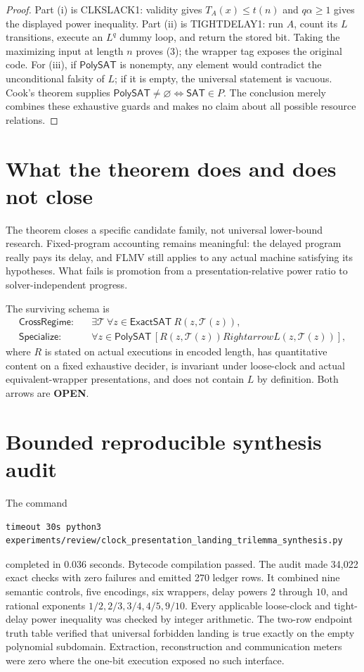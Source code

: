 \documentclass[11pt]{article}
\newcommand{\SAT}{\mathsf{SAT}}
\newcommand{\ExactSAT}{\mathsf{ExactSAT}}
\newcommand{\PolySAT}{\mathsf{PolySAT}}
\newcommand{\OPEN}{\textbf{OPEN}}
\begin{document}
\begin{proof}
Part (i) is CLKSLACK1: validity gives $T_A(x)\le t(n)$ and
$q\alpha\ge1$ gives the displayed power inequality.  Part (ii) is
TIGHTDELAY1: run $A$, count its $L$ transitions, execute an $L^q$ dummy loop,
and return the stored bit.  Taking the maximizing input at length $n$ proves
(3); the wrapper tag exposes the original code.  For (iii), if $\PolySAT$ is
nonempty, any element would contradict the unconditional falsity of $L$; if
it is empty, the universal statement is vacuous.  Cook's theorem supplies
$\PolySAT\ne\varnothing\Leftrightarrow\SAT\in P$.  The conclusion merely
combines these exhaustive guards and makes no claim about all possible
resource relations.
\end{proof}

\section{What the theorem does and does not close}

The theorem closes a specific candidate family, not universal lower-bound
research.  Fixed-program accounting remains meaningful: the delayed program
really pays its delay, and FLMV still applies to any actual machine satisfying
its hypotheses.  What fails is promotion from a presentation-relative power
ratio to solver-independent progress.

The surviving schema is
\begin{align*}
\textsf{CrossRegime}:\quad&
 \exists\mathcal T\ \forall z\in\ExactSAT\ R(z,\mathcal T(z)),\tag{5}\\
\textsf{Specialize}:\quad&
 \forall z\in\PolySAT\,[R(z,\mathcal T(z))Rightarrow
 L(z,\mathcal T(z))],                                      \tag{6}
\end{align*}
where $R$ is stated on actual executions in encoded length, has quantitative
content on a fixed exhaustive decider, is invariant under loose-clock and
actual equivalent-wrapper presentations, and does not contain $L$ by
definition.  Both arrows are \OPEN.

\section{Bounded reproducible synthesis audit}

The command
\begin{verbatim}
timeout 30s python3 experiments/review/clock_presentation_landing_trilemma_synthesis.py
\end{verbatim}
completed in $0.036$ seconds.  Bytecode compilation passed.  The audit made
34,022 exact checks with zero failures and emitted 270 ledger rows.  It
combined nine semantic controls, five encodings, six wrappers, delay powers
$2$ through $10$, and rational exponents
$1/2,2/3,3/4,4/5,9/10$.  Every applicable loose-clock and tight-delay power
inequality was checked by integer arithmetic.  The two-row endpoint truth
table verified that universal forbidden landing is true exactly on the empty
polynomial subdomain.  Extraction, reconstruction and communication meters
were zero where the one-bit execution exposed no such interface.
\end{document}
